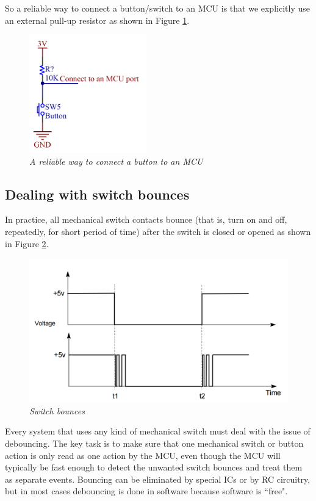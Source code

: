 So a reliable way to connect a button/switch to an MCU is that we explicitly use an external pull-up resistor as shown in Figure \ref{bai4_pic_button_schematic_1}.

 \begin{figure}[!htp]
    \centering
    \includegraphics[width=2in]{source/picture/bai_3/Button_Schematic.png}
    \caption{\textit{A reliable way to connect a button to an MCU}}
    \label{bai4_pic_button_schematic_1}
\end{figure}
 
\subsection{Dealing with switch bounces}
In practice, all mechanical switch contacts bounce (that is, turn on and off, repeatedly, for short period of time) after the switch is closed or opened as shown in Figure \ref{bai4_pic_switchsbounce}.
\begin{figure}[!htp]
    \centering
    \includegraphics[width=4.5in]{source/picture/bai_3/switchsbounce.png}
    \caption{\textit{Switch bounces}}
    \label{bai4_pic_switchsbounce}
\end{figure}

Every system that uses any kind of mechanical switch must deal with the issue of debouncing.  The key task is to make sure that one mechanical switch or button action is only read as one action by the MCU, even though the MCU will typically be fast enough to detect the unwanted switch bounces and treat them as separate events.  Bouncing can be eliminated by special ICs or by RC circuitry, but in most cases debouncing is done in software because software is ``free".

